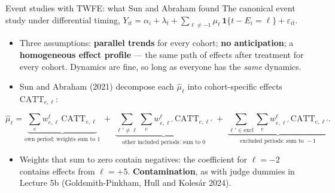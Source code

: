 \documentclass[
  11pt,
  ignorenonframetext,
  aspectratio=169,
]{beamer}
\providecommand{\tightlist}{%
  \setlength{\itemsep}{0pt}\setlength{\parskip}{0pt}}
\begin{document}
\begin{frame}{Event studies with TWFE: what Sun and Abraham found}
\protect{}\label{event-studies-with-twfe-what-sun-and-abraham-found}
The canonical event study under differential timing,
\(Y_{it} = \alpha_i + \lambda_t + \sum_{\ell \ne -1}\mu_\ell\,\mathbf{1}\{t - E_i = \ell\} + \varepsilon_{it}\).

\begin{itemize}
\tightlist
\item
  Three assumptions: \textbf{parallel trends} for every cohort;
  \textbf{no anticipation}; a \textbf{homogeneous effect profile} ---
  the same path of effects after treatment for every cohort. Dynamics
  are fine, so long as everyone has the \emph{same} dynamics.
\item
  Sun and Abraham (2021) decompose each \(\hat\mu_\ell\) into
  cohort-specific effects \(\text{CATT}_{e,\ell}\):
\end{itemize}

\[
\hat\mu_\ell = \underbrace{\sum_e w^{\ell}_{e,\ell}\,\text{CATT}_{e,\ell}}_{\text{own period: weights sum to } 1} \;+\;
\underbrace{\sum_{\ell' \ne \ell}\sum_e w^{\ell}_{e,\ell'}\,\text{CATT}_{e,\ell'}}_{\text{other included periods: sum to } 0} \;+\;
\underbrace{\sum_{\ell' \in \text{excl}}\sum_e w^{\ell}_{e,\ell'}\,\text{CATT}_{e,\ell'}}_{\text{excluded periods: sum to } -1}.
\]

\begin{itemize}
\tightlist
\item
  Weights that sum to zero contain negatives: the coefficient for
  \(\ell = -2\) contains effects from \(\ell = +5\).
  \textbf{Contamination}, as with judge dummies in Lecture 5b
  (Goldsmith-Pinkham, Hull and Kolesár 2024).
\end{itemize}
\end{frame}
\end{document}
